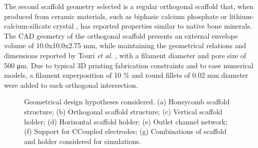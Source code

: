 The second scaffold geometry selected is a regular orthogonal scaffold that, when produced from ceramic materials, such as biphasic calcium phosphate \cite{Touri2018-jw} or lithium-calcium-silicate crystal \cite{Chen2019-ap}, has reported properties similar to native bone minerals. The \acs{CAD} geometry of the orthogonal scaffold presents an external envelope volume of 10.0x10.0x2.75 \unit{\milli\meter}, while maintaining the geometrical relations and dimensions reported by Touri \textit{et al.} \cite{Touri2018-jw}, with a filament diameter and pore size of 500 \unit{\micro\meter}. Due to typical 3D printing fabrication constraints and to ease numerical models, a filament superposition of 10 \% and round fillets of 0.02 \unit{\milli\meter} diameter were added to each orthogonal intersection.


\begin{figure}
\caption{Geometrical design hypotheses considered. (a) Honeycomb scaffold structure; (b) Orthogonal scaffold structure; (c) Vertical scaffold holder; (d) Horizontal scaffold holder; (e) Outlet channel network; (f) Support for CCoupled electrodes; (g) Combinations of scaffold and holder considered for simulations.}
\label{figParts}
\end{figure}


